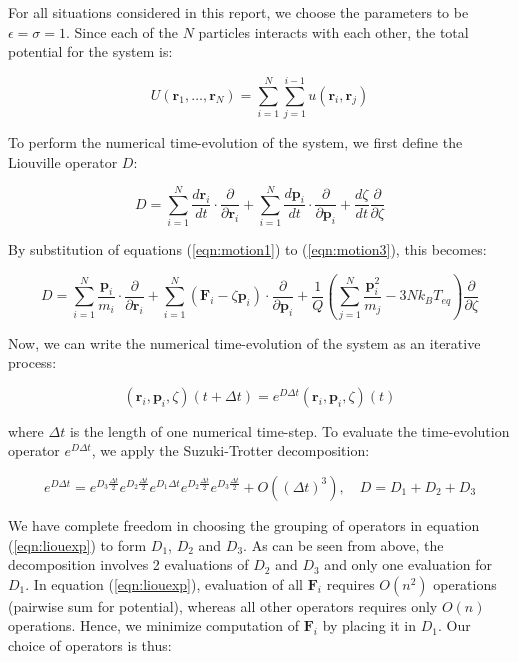 \documentclass[a4paper,10pt]{article}
\begin{document}
For all situations considered in this report, we choose the parameters to be $\epsilon=\sigma=1$. Since each of the $N$ particles interacts with each other, the total potential for the system is:

\begin{equation}
U(\mathbf{r}_1,\ldots,\mathbf{r}_N)=\displaystyle\sum_{i=1}^{N}\sum_{j=1}^{i-1}u(\mathbf{r}_i,\mathbf{r}_j)
\end{equation}

To perform the numerical time-evolution of the system, we first define the Liouville operator $D$:

\begin{equation}
D = \displaystyle\sum_{i=1}^N \frac{d\mathbf{r}_i}{dt} \cdot \frac{\partial}{\partial \mathbf{r}_i} + \sum_{i=1}^N \frac{d\mathbf{p}_i}{dt} \cdot \frac{\partial}{\partial \mathbf{p}_i} + \frac{d\zeta}{dt} \frac{\partial}{\partial \zeta}
\end{equation}

By substitution of equations (\ref{eqn:motion1}) to (\ref{eqn:motion3}), this becomes:

\begin{equation}
D = \displaystyle\sum_{i=1}^N \frac{\mathbf{p}_i}{m_i} \cdot \frac{\partial}{\partial \mathbf{r}_i} + \sum_{i=1}^N \left( \mathbf{F}_i - \zeta \mathbf{p}_i \right) \cdot \frac{\partial}{\partial \mathbf{p}_i} + \frac{1}{Q} \left( \displaystyle\sum_{j=1}^N \frac{\mathbf{p}_i^2}{m_j} - 3Nk_B T_{eq} \right) \frac{\partial}{\partial \zeta}
\label{eqn:liouexp}
\end{equation}

Now, we can write the numerical time-evolution of the system as an iterative process:

\begin{equation}
(\mathbf{r}_i,\mathbf{p}_i,\zeta)(t+\Delta t) = e^{D\Delta t}(\mathbf{r}_i,\mathbf{p}_i,\zeta)(t)
\end{equation}

where $\Delta t$ is the length of one numerical time-step. To evaluate the time-evolution operator $e^{D\Delta t}$, we apply the Suzuki-Trotter decomposition:

\begin{equation}
e^{D\Delta t} = e^{D_3\frac{\Delta t}{2}}e^{D_2\frac{\Delta t}{2}}e^{D_1\Delta t}e^{D_2\frac{\Delta t}{2}}e^{D_3\frac{\Delta t}{2}} + O((\Delta t)^3), \quad D = D_1+D_2+D_3
\end{equation}

We have complete freedom in choosing the grouping of operators in equation (\ref{eqn:liouexp}) to form $D_1$, $D_2$ and $D_3$. As can be seen from above, the decomposition involves 2 evaluations of $D_2$ and $D_3$ and only one evaluation for $D_1$. In equation (\ref{eqn:liouexp}), evaluation of all $\mathbf{F}_i$ requires $O(n^2)$ operations (pairwise sum for potential), whereas all other operators requires only $O(n)$ operations. Hence, we minimize computation of $\mathbf{F}_i$ by placing it in $D_1$. Our choice of operators is thus:
\end{document}
